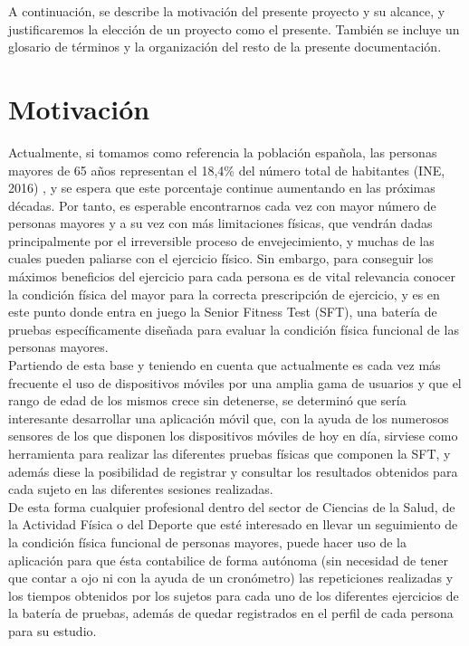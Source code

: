 

A continuación, se describe la motivación del presente proyecto y su alcance, y justificaremos la elección de un proyecto como el presente. También se incluye un glosario de términos y la organización del resto de la presente documentación.

\section{Motivación}

Actualmente, si tomamos como referencia la población española, las personas mayores de 65 años representan el 18,4\% del número total de habitantes (INE, 2016) \cite{website:ine}, y se espera que este porcentaje continue aumentando en las próximas décadas. Por tanto, es esperable encontrarnos cada vez con mayor número de personas mayores y a su vez con más limitaciones físicas, que vendrán dadas principalmente por el irreversible proceso de envejecimiento, y muchas de las cuales pueden paliarse con el ejercicio físico. Sin embargo, para conseguir los máximos beneficios del ejercicio para cada persona es de vital relevancia conocer la condición física del mayor para la correcta prescripción de ejercicio, y es en este punto donde entra en juego la Senior Fitness Test (SFT), una batería de pruebas específicamente diseñada para evaluar la condición física funcional de las personas mayores.\\

Partiendo de esta base y teniendo en cuenta que actualmente es cada vez más frecuente el uso de dispositivos móviles por una amplia gama de usuarios y que el rango de edad de los mismos crece sin detenerse, se determinó que sería interesante desarrollar una aplicación móvil que, con la ayuda de los numerosos sensores de los que disponen los dispositivos móviles de hoy en día, sirviese como herramienta para realizar las diferentes pruebas físicas que componen la SFT, y además diese la posibilidad de registrar y consultar los resultados obtenidos para cada sujeto en las diferentes sesiones realizadas.\\

De esta forma cualquier profesional dentro del sector de Ciencias de la Salud, de la Actividad Física o del Deporte que esté interesado en llevar un seguimiento de la condición física funcional de personas mayores, puede hacer uso de la aplicación para que ésta contabilice de forma autónoma (sin necesidad de tener que contar a ojo ni con la ayuda de un cronómetro) las repeticiones realizadas y los tiempos obtenidos por los sujetos para cada uno de los diferentes ejercicios de la batería de pruebas, además de quedar registrados en el perfil de cada persona para su estudio.\\

